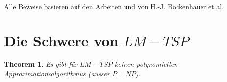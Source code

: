 \documentclass[a4paper,11pt]{scrreprt}
\begin{document}

Alle Beweise basieren auf den Arbeiten \cite{bok1} und \cite{bok2} von H.-J. Böckenhauer et al.

\section{Die Schwere von $LM-TSP$}

\newtheorem{t1}{Theorem}

\begin{t1}
Es gibt für $LM-TSP$ keinen polynomiellen Approximationsalgorithmus (ausser $P = NP$).
\end{t1}
\end{document}
